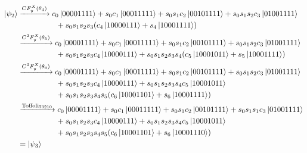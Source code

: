\documentclass[11pt, oneside]{article}   	%
\begin{document}
\begin{align*}
\ket{\psi_2}
&\xrightarrow{CF^X_y(\theta_4)} 
c_0 \ket{00001111} 
+ s_0 c_1 \ket{00011111}
+ s_0 s_1 c_2 \ket{00101111}
+ s_0 s_1 s_2 c_3 \ket{01001111} \\
& \hspace{5em} + s_0 s_1 s_2 s_3 (c_4 \ket{10000111} + s_4 \ket{10001111}) \\
&\xrightarrow{C^2 F^X_y(\theta_5)} 
c_0 \ket{00001111} 
+ s_0 c_1 \ket{00011111}
+ s_0 s_1 c_2 \ket{00101111} 
+ s_0 s_1 s_2 c_3 \ket{01001111} \\
& \hspace{5em}  
+ s_0 s_1 s_2 s_3 c_4 \ket{10000111} 
+ s_0 s_1 s_2 s_3 s_4 (c_5 \ket{10001011} + s_5 \ket{10001111}) \\
&\xrightarrow{C^3 F^X_y(\theta_6)} 
c_0 \ket{00001111} 
+ s_0 c_1 \ket{00011111}
+ s_0 s_1 c_2 \ket{00101111}
+ s_0 s_1 s_2 c_3 \ket{01001111} \\
& \hspace{5em}
+ s_0 s_1 s_2 s_3 c_4 \ket{10000111}
+ s_0 s_1 s_2 s_3 s_4 c_5 \ket{10001011} \\
& \hspace{5em} 
+ s_0 s_1 s_2 s_3 s_4 s_5 (c_6 \ket{10001101} + s_6 \ket{10001111} ) \\
&\xrightarrow{\text{Toffoli}_{73210}} 
c_0 \ket{00001111} 
+ s_0 c_1 \ket{00011111}
+ s_0 s_1 c_2 \ket{00101111} 
+ s_0 s_1 s_1 c_3 \ket{01001111} \\
& \hspace{5em} 
+ s_0 s_1 s_2 s_3 c_4 \ket{10000111}
+ s_0 s_1 s_2 s_3 s_4 c_5 \ket{10001011} \\
& \hspace{5em} 
+ s_0 s_1 s_2 s_3 s_4 s_5 (c_6 \ket{10001101} + s_6 \ket{10001110} ) \\
& = \ket{\psi_3} 
\end{align*}
\end{document}
